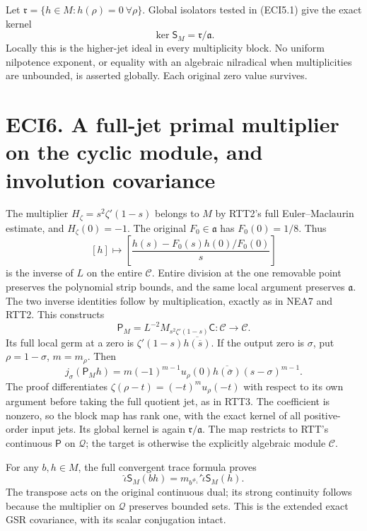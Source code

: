 Let \(\mathfrak r=\{h\in M:h(\rho)=0\ \forall\rho\}\). Global isolators
tested in (ECI5.1) give the exact kernel \[
\ker\mathsf S_M=\mathfrak r/\mathfrak a.
\tag{ECI5.7}
\] Locally this is the higher-jet ideal in every multiplicity block. No
uniform nilpotence exponent, or equality with an algebraic nilradical
when multiplicities are unbounded, is asserted globally. Each original
zero value survives.

\section{ECI6. A full-jet primal multiplier on the cyclic module, and
involution
covariance}\label{eci6.-a-full-jet-primal-multiplier-on-the-cyclic-module-and-involution-covariance}

The multiplier \(H_\zeta=s^2\zeta'(1-s)\) belongs to \(M\) by RTT2's
full Euler--Maclaurin estimate, and \(H_\zeta(0)=-1\). The original
\(F_0\in\mathfrak a\) has \(F_0(0)=1/8\). Thus \[
[h]\longmapsto
\left[\frac{h(s)-F_0(s)h(0)/F_0(0)}s\right]
\tag{ECI6.1}
\] is the inverse of \(L\) on the entire \(\mathscr C\). Entire division
at the one removable point preserves the polynomial strip bounds, and
the same local argument preserves \(\mathfrak a\). The two inverse
identities follow by multiplication, exactly as in NEA7 and RTT2. This
constructs \[
\mathsf P_M=L^{-2}M_{s^2\zeta'(1-s)}\mathsf C:
\mathscr C\to\mathscr C.
\tag{ECI6.2}
\] Its full local germ at a zero is
\(\zeta'(1-s)\overline{h(\overline s)}\). If the output zero is
\(\sigma\), put \(\rho=1-\sigma\), \(m=m_\rho\). Then \[
j_\sigma(\mathsf P_Mh)=
m(-1)^{m-1}u_\rho(0)\overline{h(\overline\sigma)}(s-\sigma)^{m-1}.
\tag{ECI6.3}
\] The proof differentiates \(\zeta(\rho-t)=(-t)^mu_\rho(-t)\) with
respect to its own argument before taking the full quotient jet, as in
RTT3. The coefficient is nonzero, so the block map has rank one, with
the exact kernel of all positive-order input jets. Its global kernel is
again \(\mathfrak r/\mathfrak a\). The map restricts to RTT's continuous
\(\mathsf P\) on \(\mathcal Q\); the target is otherwise the explicitly
algebraic module \(\mathscr C\).

For any \(b,h\in M\), the full convergent trace formula proves \[
\widehat\iota\mathsf S_M(bh)
=m_{b^{\#_1}}'\widehat\iota\mathsf S_M(h).
\tag{ECI6.4}
\] The transpose acts on the original continuous dual; its strong
continuity follows because the multiplier on \(\mathcal Q\) preserves
bounded sets. This is the extended exact GSR covariance, with its scalar
conjugation intact.

